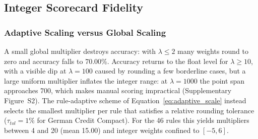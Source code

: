\subsection{Integer Scorecard Fidelity}
\label{subsec:quantization_fidelity}



\subsubsection{Adaptive Scaling versus Global Scaling}
A small global multiplier destroys accuracy: with $\lambda \le 2$ many weights
round to zero and accuracy falls to 70.00\%. Accuracy returns to the float level
for $\lambda \ge 10$, with a visible dip at $\lambda = 100$ caused by rounding a
few borderline cases, but a large uniform multiplier inflates the integer range:
at $\lambda = 1000$ the point span approaches 700, which makes manual scoring
impractical (Supplementary Figure~S2). The rule-adaptive scheme of
Equation~\eqref{eq:adaptive_scale} instead selects the smallest multiplier per
rule that satisfies a relative rounding tolerance ($\tau_{tol} = 1\%$ for German
Credit Compact). For the 46 rules this yields multipliers between 4 and 20 (mean
15.00) and integer weights confined to $[-5, 6]$.

